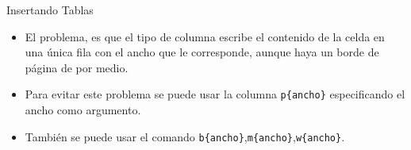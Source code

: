 \documentclass[12pt]{beamer}
\begin{document}
\begin{frame}{Insertando Tablas}
  \begin{itemize}
    \item<1-> El problema, es que el tipo de columna escribe el contenido de la celda en una única fila con el ancho que le corresponde, aunque haya un borde de página de por medio.
    \item <2-> Para evitar este problema se puede usar la columna \texttt{\color{blue}p\{ancho\}} especificando el ancho como argumento.
    \item <3-> También se puede usar el comando \texttt{\color{blue}b\{ancho\}},\texttt{\color{blue}m\{ancho\}},\texttt{\color{blue}w\{ancho\}}.
  \end{itemize}
  
\end{frame}  
\end{document}
